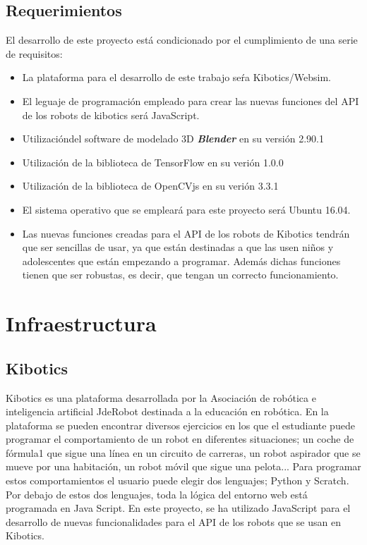 \documentclass{report}
\begin{document}
\section{Requerimientos}
El desarrollo de este proyecto está condicionado por el cumplimiento de una serie de requisitos:

\begin{itemize}
\item La plataforma para el desarrollo de este trabajo seŕa Kibotics/Websim.
\item El leguaje de programación empleado para crear las nuevas funciones del API de los robots de kibotics será JavaScript.
\item Utilizacióndel software de modelado 3D \textit{\textbf{Blender}} en su versión 2.90.1
\item Utilización de la biblioteca de TensorFlow en su verión 1.0.0
\item Utilización de la biblioteca de OpenCVjs en su verión 3.3.1
\item El sistema operativo que se empleará para este proyecto será Ubuntu 16.04.
\item Las nuevas funciones creadas para el API de los robots de Kibotics tendrán que ser sencillas de usar, ya que están destinadas a que las usen niños y adolescentes que están empezando a programar. Además dichas funciones tienen que ser robustas, es decir, que tengan un correcto funcionamiento.
\end{itemize}

\chapter{Infraestructura}
\section{Kibotics}
Kibotics es una plataforma desarrollada por la Asociación de robótica e inteligencia artificial JdeRobot destinada a la educación en robótica. En la plataforma se pueden encontrar diversos ejercicios en los que el estudiante puede programar el comportamiento de un robot en diferentes situaciones; un coche de fórmula1 que sigue una línea en un circuito de carreras, un robot aspirador que se mueve por una habitación, un robot móvil que sigue una pelota... Para programar estos comportamientos el usuario puede elegir dos lenguajes; Python y Scratch. Por debajo de estos dos lenguajes, toda la lógica del entorno web está programada en Java Script. En este proyecto, se ha utilizado JavaScript para el desarrollo de nuevas funcionalidades para el API de los robots que se usan en Kibotics. 
\\
\end{document}
